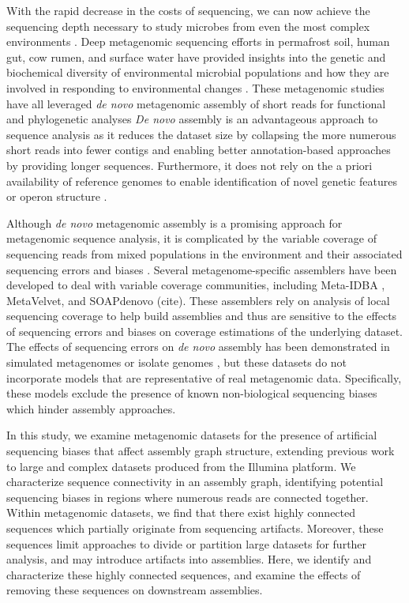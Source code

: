 \documentclass[10pt]{article}
\begin{document}
With the rapid decrease in the costs of sequencing, we can now
achieve the sequencing depth necessary to study microbes from even the most complex
environments \cite{Hess:2011p686,Qin:2010p189}.  Deep
metagenomic sequencing efforts in permafrost soil, human gut, cow
rumen, and surface water have provided insights into the genetic and
biochemical diversity of environmental microbial populations
\cite{Hess:2011p686,Iverson:2012p1281,Qin:2010p189} and how
they are involved in responding to environmental changes
\cite{Mackelprang:2011p1087}. These metagenomic studies have all
leveraged \emph{de novo} metagenomic assembly of short reads for
functional and phylogenetic analyses
\emph{De novo} assembly is
an advantageous approach to sequence analysis as it reduces the
dataset size by collapsing the more numerous short reads into fewer contigs and
enabling better annotation-based approaches by providing longer sequences.
\cite{Miller:2010p226,Pop:2009p798}
Furthermore, it does not rely on the a priori availability of
reference genomes to enable identification of novel genetic features or
operon structure \cite{Hess:2011p686,Iverson:2012p1281}.

Although \emph{de novo} metagenomic assembly is a promising approach
for metagenomic sequence analysis, it is complicated by the variable
coverage of sequencing reads from mixed populations in the environment
and their associated sequencing errors and biases
\cite{Mende:2012p1262,Pignatelli:2011p742}. Several
metagenome-specific assemblers have been developed to deal with
variable coverage communities, including Meta-IDBA
\cite{Peng:2011p898}, MetaVelvet, and SOAPdenovo (cite).  These assemblers
rely on analysis of local sequencing coverage to help build assemblies
and thus are sensitive to the effects of sequencing errors and biases
on coverage estimations of the underlying dataset. The effects of
sequencing errors on \emph{de novo} assembly has been demonstrated in
simulated metagenomes
\cite{Mavromatis:2006p894,Mende:2012p1262,Pignatelli:2011p742} or
isolate genomes \cite{Morgan:2010p740}, but these datasets do not
incorporate models that are representative of real metagenomic data.
Specifically, these models exclude the presence of known
non-biological sequencing biases
\cite{GomezAlvarez:2009p1334,Keegan:2012p1336,Niu:2010p1333} which
hinder assembly approaches.

In this study, we examine metagenomic datasets for the presence of
artificial sequencing biases that affect assembly graph structure,
extending previous work to large and complex datasets produced from
the Illumina platform. We characterize sequence connectivity in an
assembly graph, identifying potential sequencing biases in regions
where numerous reads are connected together.  Within metagenomic
datasets, we find that there exist highly connected sequences which
partially originate from sequencing artifacts.  Moreover,
these sequences limit approaches to divide or partition large datasets
for further analysis, and may introduce artifacts into assemblies.  Here, we
identify and characterize these highly connected
sequences, and examine the effects of removing these sequences on
downstream assemblies.
\end{document}
